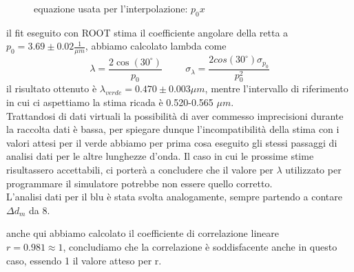 \documentclass{article}
\theoremstyle{definition}
\begin{document}
\begin{figure}[!ht]
    	\captionsetup{labelformat=empty}
		\caption{equazione usata per l'interpolazione: $p_{0}x$}

\end{figure}
il fit eseguito con ROOT stima il coefficiente angolare della retta a \(p_{0}=3.69 \pm 0.02 \frac{1}{\mu m}\), abbiamo calcolato lambda come 
\[\lambda=\frac{2\cos(30^{\circ})}{p_{0}} \hspace{1cm} \sigma_{\lambda} = \frac{2cos(30^{\circ})\sigma_{p_{0}}}{p_{0}^{2}}\]
il risultato ottenuto è \(\lambda_{verde} = 0.470\pm0.003 \mu m\), mentre l'intervallo di riferimento in cui ci aspettiamo la stima ricada è 0.520-0.565 $\mu m$.\\ Trattandosi di dati virtuali la possibilità di aver commesso imprecisioni durante la raccolta dati è bassa, per spiegare dunque l'incompatibilità della stima con i valori attesi per il verde abbiamo per prima cosa eseguito gli stessi passaggi di analisi dati per le altre lunghezze d'onda. Il caso in cui le prossime stime risultassero accettabili, ci porterà a concludere che il valore per \(\lambda\) utilizzato per programmare il simulatore potrebbe non essere quello corretto. \\

\noindent L'analisi dati per il blu è stata svolta analogamente, sempre partendo a contare $\Delta d_{m}$ da 8.\\

\begin{figure}[!htbp]
    	\captionsetup{labelformat=empty}
    \end{figure}
anche qui abbiamo calcolato il coefficiente di correlazione lineare\\ \(r=0.981\approx1\), concludiamo che la correlazione è soddisfacente anche in questo caso, essendo 1 il valore atteso per r.\\
\end{document}
